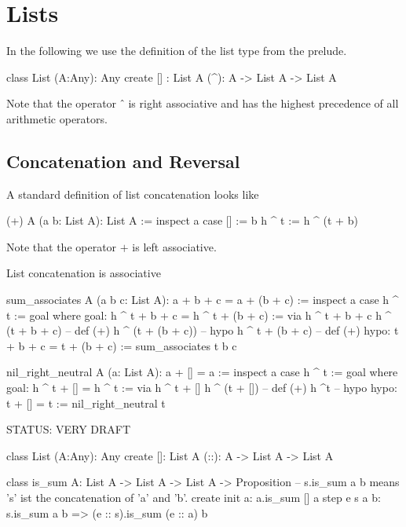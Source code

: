 \newpage
\section{Lists}
\label{sec:certprog-lists}


In the following we use the definition of the list type from the prelude.

\begin{alba}
  class
    List (A:Any): Any
  create
    [] : List A
    (^): A -> List A -> List A
\end{alba}
%
Note that the operator $\mathrel{\hat{\ }}$ is right associative and has the
highest precedence of all arithmetic operators.



\subsection{Concatenation and Reversal}


A standard definition of list concatenation looks like

\begin{alba}
  (+) A (a b: List A): List A :=
    inspect a case
      [] :=
        b
      h ^ t :=
        h ^ (t + b)
\end{alba}
Note that the operator $+$ is left associative.


List concatenation is associative
%
\begin{alba}
  sum_associates A (a b c: List A): a + b + c = a + (b + c) :=
    inspect a case
      h ^ t :=
        goal where
          goal: h ^ t + b + c = h ^ t + (b + c) :=
            via
               h ^ t + b + c
               h ^ (t + b + c)      -- def (+)
               h ^ (t + (b + c))    -- hypo
               h ^ t + (b + c)      -- def (+)
          hypo: t + b + c = t + (b + c) :=
            sum_associates t b c
\end{alba}


\begin{alba}
  nil_right_neutral A (a: List A): a + [] = a :=
    inspect a case
      h ^ t :=
        goal where
          goal: h ^ t + [] = h ^ t :=
            via
              h ^ t + []
              h ^ (t + [])   -- def (+)
              h ^t           -- hypo
          hypo: t + [] = t :=
            nil_right_neutral t
\end{alba}

\vskip 10mm
\noindent STATUS: VERY DRAFT


\begin{alba}
  class
    List (A:Any): Any
  create
    []: List A
    (::): A -> List A -> List A

  class
    is_sum A: List A -> List A -> List A -> Proposition
      -- s.is_sum a b means 's' ist the concatenation of 'a' and 'b'.
  create
    init a:
      a.is_sum [] a
    step e s a b:
      s.is_sum a b
      =>
      (e :: s).is_sum (e :: a) b
\end{alba}




